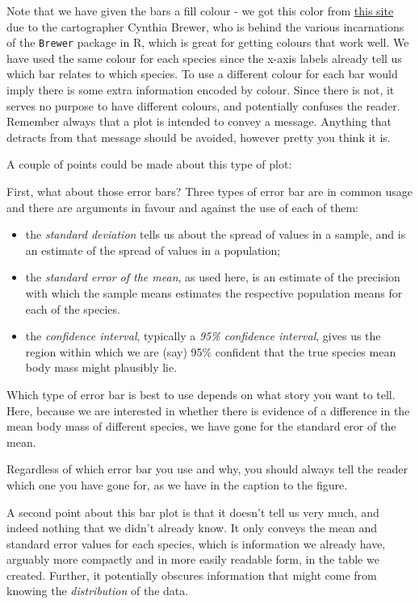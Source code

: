 \documentclass[
  letterpaper,
  DIV=11,
  numbers=noendperiod]{scrreprt}
\providecommand{\tightlist}{%
  \setlength{\itemsep}{0pt}\setlength{\parskip}{0pt}}\usepackage{longtable,booktabs,array}
\begin{document}
Note that we have given the bars a fill colour - we got this color from
\href{https://colorbrewer2.org/\#type=sequential&scheme=PuBu&n=3}{this
site} due to the cartographer Cynthia Brewer, who is behind the various
incarnations of the \texttt{Brewer} package in R, which is great for
getting colours that work well. We have used the same colour for each
species since the x-axis labels already tell us which bar relates to
which species. To use a different colour for each bar would imply there
is some extra information encoded by colour. Since there is not, it
serves no purpose to have different colours, and potentially confuses
the reader. Remember always that a plot is intended to convey a message.
Anything that detracts from that message should be avoided, however
pretty you think it is.

A couple of points could be made about this type of plot:

First, what about those error bars? Three types of error bar are in
common usage and there are arguments in favour and against the use of
each of them:

\begin{itemize}
\tightlist
\item
  the \emph{standard deviation} tells us about the spread of values in a
  sample, and is an estimate of the spread of values in a population;\\
\item
  the \emph{standard error of the mean}, as used here, is an estimate of
  the precision with which the sample means estimates the respective
  population means for each of the species.
\item
  the \emph{confidence interval}, typically a \emph{95\% confidence
  interval}, gives us the region within which we are (say) 95\%
  confident that the true species mean body mass might plausibly lie.
\end{itemize}

Which type of error bar is best to use depends on what story you want to
tell. Here, because we are interested in whether there is evidence of a
difference in the mean body mass of different species, we have gone for
the standard eror of the mean.

Regardless of which error bar you use and why, you should always tell
the reader which one you have gone for, as we have in the caption to the
figure.

A second point about this bar plot is that it doesn't tell us very much,
and indeed nothing that we didn't already know. It only conveys the mean
and standard error values for each species, which is information we
already have, arguably more compactly and in more easily readable form,
in the table we created. Further, it potentially obscures information
that might come from knowing the \emph{distribution} of the data.
\end{document}
